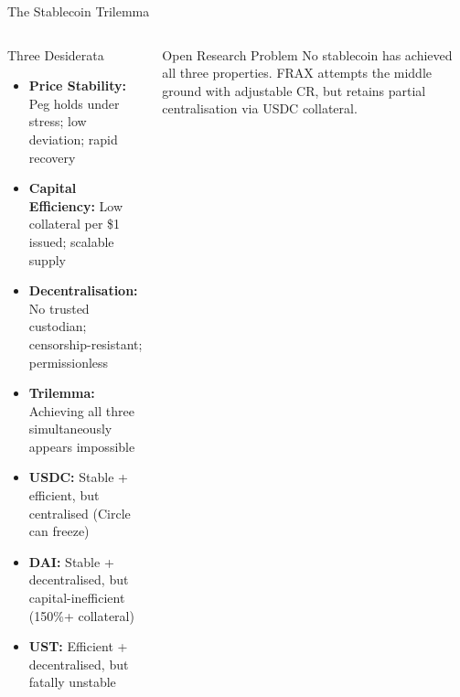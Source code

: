 \documentclass[8pt,aspectratio=169]{beamer}
\begin{document}
\begin{frame}{The Stablecoin Trilemma}
\begin{columns}[T]
\begin{block}{Three Desiderata}
\begin{itemize}\setlength{\itemsep}{2pt}
  \item \textbf{Price Stability:} Peg holds under stress; low deviation; rapid recovery
  \item \textbf{Capital Efficiency:} Low collateral per \$1 issued; scalable supply
  \item \textbf{Decentralisation:} No trusted custodian; censorship-resistant; permissionless
  \item \textbf{Trilemma:} Achieving all three simultaneously appears impossible
  \item \textbf{USDC:} Stable + efficient, but centralised (Circle can freeze)
  \item \textbf{DAI:} Stable + decentralised, but capital-inefficient (150\%+ collateral)
  \item \textbf{UST:} Efficient + decentralised, but fatally unstable
\end{itemize}
\end{block}
\vspace{2mm}
\begin{alertblock}{Open Research Problem}
\scriptsize No stablecoin has achieved all three properties. FRAX attempts the middle ground with adjustable CR, but retains partial centralisation via USDC collateral.
\end{alertblock}
\end{columns}
\end{frame}
\end{document}
